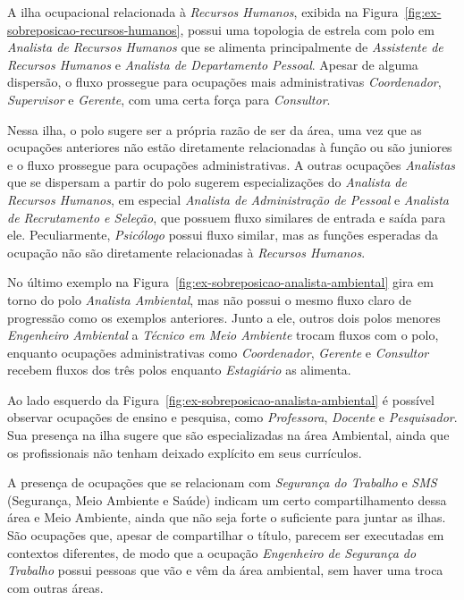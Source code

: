 \documentclass[12pt,a4paper]{article}
\begin{document}
A ilha ocupacional relacionada à \textit{Recursos Humanos}, exibida na Figura~\ref{fig:ex-sobreposicao-recursos-humanos}, possui uma topologia de estrela com polo em \textit{Analista de Recursos Humanos} que se alimenta principalmente de \textit{Assistente de Recursos Humanos} e \textit{Analista de Departamento Pessoal}. Apesar de alguma dispersão, o fluxo prossegue para ocupações mais administrativas \textit{Coordenador}, \textit{Supervisor} e \textit{Gerente}, com uma certa força para \textit{Consultor}.

Nessa ilha, o polo sugere ser a própria razão de ser da área, uma vez que as ocupações anteriores não estão diretamente relacionadas à função ou são juniores e o fluxo prossegue para ocupações administrativas. A outras ocupações \textit{Analistas} que se dispersam a partir do polo sugerem especializações do \textit{Analista de Recursos Humanos}, em especial \textit{Analista de Administração de Pessoal} e \textit{Analista de Recrutamento e Seleção}, que possuem fluxo similares de entrada e saída para ele. Peculiarmente, \textit{Psicólogo} possui fluxo similar, mas as funções esperadas da ocupação não são diretamente relacionadas à \textit{Recursos Humanos}.

No último exemplo na Figura~\ref{fig:ex-sobreposicao-analista-ambiental} gira em torno do polo \textit{Analista Ambiental}, mas não possui o mesmo fluxo claro de progressão como os exemplos anteriores. Junto a ele, outros dois polos menores \textit{Engenheiro Ambiental} a \textit{Técnico em Meio Ambiente} trocam fluxos com o polo, enquanto ocupações administrativas como \textit{Coordenador}, \textit{Gerente} e \textit{Consultor} recebem fluxos dos três polos enquanto \textit{Estagiário} as alimenta.

Ao lado esquerdo da Figura~\ref{fig:ex-sobreposicao-analista-ambiental} é possível observar ocupações de ensino e pesquisa, como \textit{Professora}, \textit{Docente} e \textit{Pesquisador}. Sua presença na ilha sugere que são especializadas na área Ambiental, ainda que os profissionais não tenham deixado explícito em seus currículos.

A presença de ocupações que se relacionam com \textit{Segurança do Trabalho} e \textit{SMS} (Segurança, Meio Ambiente e Saúde) indicam um certo compartilhamento dessa área e Meio Ambiente, ainda que não seja forte o suficiente para juntar as ilhas. São ocupações que, apesar de compartilhar o título, parecem ser executadas em contextos diferentes, de modo que a ocupação \textit{Engenheiro de Segurança do Trabalho} possui pessoas que vão e vêm da área ambiental, sem haver uma troca com outras áreas.
\end{document}
